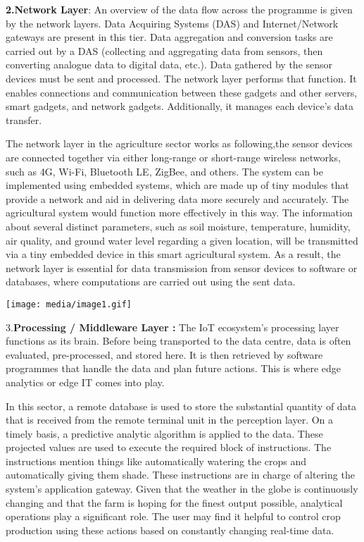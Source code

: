 \documentclass[
]{article}
\begin{document}
\textbf{{2.Network Layer}}: An overview of the data flow across the
programme is given by the network layers. Data Acquiring Systems (DAS)
and Internet/Network gateways are present in this tier. Data aggregation
and conversion tasks are carried out by a DAS (collecting and
aggregating data from sensors, then converting analogue data to digital
data, etc.). Data gathered by the sensor devices must be sent and
processed. The network layer performs that function. It enables
connections and communication between these gadgets and other servers,
smart gadgets, and network gadgets. Additionally, it manages each
device's data transfer.

The network layer in the agriculture sector works as following,the
sensor devices are connected together via either long-range or
short-range wireless networks, such as 4G, Wi-Fi, Bluetooth LE, ZigBee,
and others. The system can be implemented using embedded systems, which
are made up of tiny modules that provide a network and aid in delivering
data more securely and accurately. The agricultural system would
function more effectively in this way. The information about several
distinct parameters, such as soil moisture, temperature, humidity, air
quality, and ground water level regarding a given location, will be
transmitted via a tiny embedded device in this smart agricultural
system. As a result, the network layer is essential for data
transmission from sensor devices to software or databases, where
computations are carried out using the sent data.

\texttt{[image: media/image1.gif]}

3.\textbf{{Processing / Middleware Layer :}} The IoT ecosystem's
processing layer functions as its brain. Before being transported to the
data centre, data is often evaluated, pre-processed, and stored here. It
is then retrieved by software programmes that handle the data and plan
future actions. This is where edge analytics or edge IT comes into play.

In this sector, a remote database is used to store the substantial
quantity of data that is received from the remote terminal unit in the
perception layer. On a timely basis, a predictive analytic algorithm is
applied to the data. These projected values are used to execute the
required block of instructions. The instructions mention things like
automatically watering the crops and automatically giving them shade.
These instructions are in charge of altering the system's application
gateway. Given that the weather in the globe is continuously changing
and that the farm is hoping for the finest output possible, analytical
operations play a significant role. The user may find it helpful to
control crop production using these actions based on constantly changing
real-time data.
\end{document}

